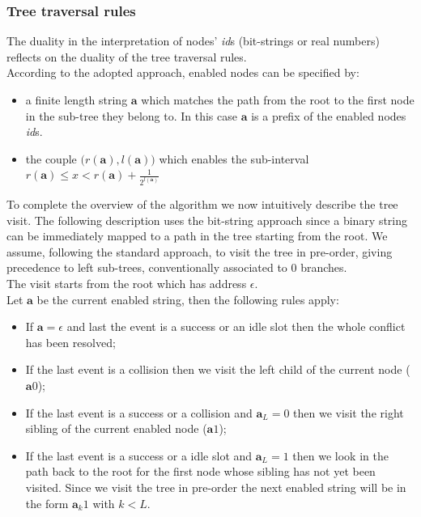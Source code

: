 \documentclass[12pt,a4paper]{report}
\begin{document}
\subsubsection{Tree traversal rules}
The duality in the interpretation of nodes' \emph{id}s (bit-strings or real numbers) reflects on the duality of the tree traversal rules.\\
According to the adopted approach, enabled nodes can be specified by:
\begin{itemize}
\item a finite length string $\mathbf{a}$ which matches the path from  the root to the first node in the sub-tree they belong to. In this case $\mathbf{a}$ is a prefix  of the enabled nodes \emph{id}s.
\item the couple $ \big(r(\mathbf{a}),l(\mathbf{a})\big)$ which enables the sub-interval $r(\mathbf{a})\leq x <r(\mathbf{a})+{\displaystyle{\frac{1}{2^{l(\mathbf{a})}}}}$
\end{itemize}

To complete the overview of the algorithm we now intuitively describe the tree visit. The following description uses the bit-string approach since a binary string can be immediately mapped to a path in the tree starting from the root.
We assume, following the standard approach, to visit the tree in pre-order, giving precedence to left sub-trees, conventionally associated to 0 branches.\\
The visit starts from the root which has address $\epsilon$.\\
Let $\mathbf{a}$ be the current enabled string, then the following rules apply:
\begin{itemize}
\item If $\mathbf{a}=\epsilon$ and last the event is  a success or an idle slot then the whole conflict has been resolved;
\item If the last event is a collision then we visit the left child of the current node ($\mathbf{a}0$);
\item If the last event is a success or a collision and $\mathbf{a}_{L}=0$ then we visit the right sibling of the current enabled node ($\mathbf{a}1$);
\item If the last event is a success or a idle slot and $\mathbf{a}_{L}=1$ then we look in the path back to the root for the first node whose sibling has not yet been visited. Since we visit the tree in pre-order the next enabled string will be in the form $\mathbf{a}_{k}1$ with $k<L$.
\end{itemize}
\end{document}

